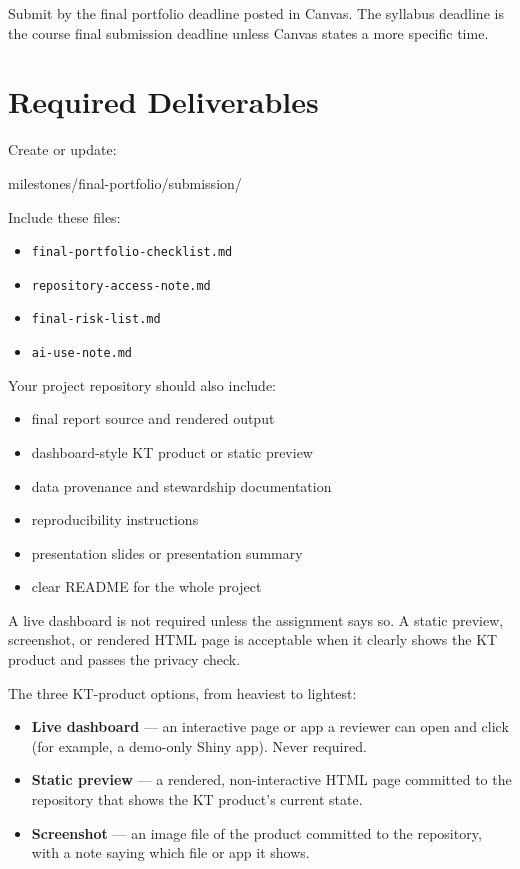 \documentclass[
  letterpaper,
  DIV=11,
  numbers=noendperiod,
  oneside]{scrreprt}
\newenvironment{Shaded}{\begin{snugshade}}{\end{snugshade}}
\newcommand{\NormalTok}[1]{\textcolor[rgb]{0.00,0.23,0.31}{#1}}
\providecommand{\tightlist}{%
  \setlength{\itemsep}{0pt}\setlength{\parskip}{0pt}}
\begin{document}
Submit by the final portfolio deadline posted in Canvas. The syllabus
deadline is the course final submission deadline unless Canvas states a
more specific time.

\section{Required Deliverables}\label{required-deliverables-6}

Create or update:

\begin{Shaded}
\begin{Highlighting}[numbers=left,,]
\NormalTok{milestones/final{-}portfolio/submission/}
\end{Highlighting}
\end{Shaded}

Include these files:

\begin{itemize}
\tightlist
\item
  \texttt{final-portfolio-checklist.md}
\item
  \texttt{repository-access-note.md}
\item
  \texttt{final-risk-list.md}
\item
  \texttt{ai-use-note.md}
\end{itemize}

Your project repository should also include:

\begin{itemize}
\tightlist
\item
  final report source and rendered output
\item
  dashboard-style KT product or static preview
\item
  data provenance and stewardship documentation
\item
  reproducibility instructions
\item
  presentation slides or presentation summary
\item
  clear README for the whole project
\end{itemize}

A live dashboard is not required unless the assignment says so. A static
preview, screenshot, or rendered HTML page is acceptable when it clearly
shows the KT product and passes the privacy check.

The three KT-product options, from heaviest to lightest:

\begin{itemize}
\tightlist
\item
  \textbf{Live dashboard} --- an interactive page or app a reviewer can
  open and click (for example, a demo-only Shiny app). Never required.
\item
  \textbf{Static preview} --- a rendered, non-interactive HTML page
  committed to the repository that shows the KT product's current state.
\item
  \textbf{Screenshot} --- an image file of the product committed to the
  repository, with a note saying which file or app it shows.
\end{itemize}
\end{document}
